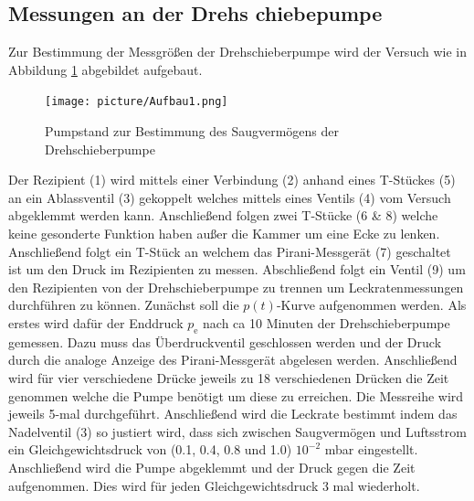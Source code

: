 \subsection{Messungen an der Drehs chiebepumpe}
Zur Bestimmung der Messgrößen der Drehschieberpumpe wird der Versuch wie in Abbildung \ref{fig:Dreh} abgebildet aufgebaut.
\begin{figure}[htpb]
  \centering
  \texttt{[image: picture/Aufbau1.png]}
  \caption{Pumpstand zur Bestimmung des Saugvermögens der Drehschieberpumpe}
  \label{fig:Dreh}
\end{figure}
Der Rezipient (1) wird mittels einer Verbindung (2) anhand eines T-Stückes (5) an ein Ablassventil (3) gekoppelt welches mittels eines Ventils (4) vom Versuch abgeklemmt werden kann. Anschließend folgen zwei T-Stücke (6 \& 8) welche keine gesonderte Funktion haben außer die Kammer um eine Ecke zu lenken. Anschließend folgt ein T-Stück an welchem das Pirani-Messgerät (7) geschaltet ist um den Druck im Rezipienten zu messen. Abschließend folgt ein Ventil (9) um den Rezipienten von der Drehschieberpumpe zu trennen um Leckratenmessungen durchführen zu können. \newline
Zunächst soll die $p(t)$-Kurve aufgenommen werden. Als erstes wird dafür der Enddruck $p_\text{e}$ nach ca 10 Minuten der Drehschieberpumpe gemessen. Dazu muss das Überdruckventil geschlossen werden und der Druck durch die analoge Anzeige des Pirani-Messgerät abgelesen werden. Anschließend wird für vier verschiedene Drücke jeweils zu 18 verschiedenen Drücken die Zeit genommen welche die Pumpe benötigt um diese zu erreichen. Die Messreihe wird jeweils 5-mal durchgeführt. \newline
Anschließend wird die Leckrate bestimmt indem das Nadelventil (3) so justiert wird, dass sich zwischen Saugvermögen und Luftsstrom ein Gleichgewichtsdruck von (0.1, 0.4, 0.8 und 1.0) \cdot $10^{-2}$ mbar eingestellt. Anschließend wird die Pumpe abgeklemmt und der Druck gegen die Zeit aufgenommen. Dies wird für jeden Gleichgewichtsdruck 3 mal wiederholt.  \newline

